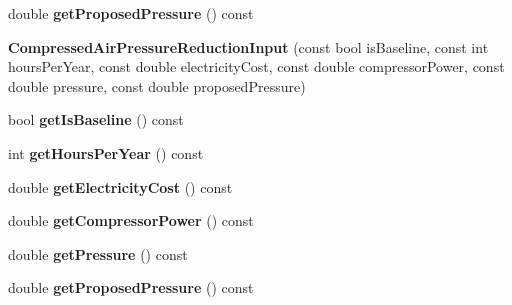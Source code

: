 \begin{DoxyCompactItemize}
\mbox{\label{class_compressed_air_pressure_reduction_input_a9634619a70b92c4f318e2711e144e510}} 
double {\bfseries get\+Proposed\+Pressure} () const
\item 
\mbox{\label{class_compressed_air_pressure_reduction_input_af3bea875794e64c677c753cf3836b53b}} 
{\bfseries Compressed\+Air\+Pressure\+Reduction\+Input} (const bool is\+Baseline, const int hours\+Per\+Year, const double electricity\+Cost, const double compressor\+Power, const double pressure, const double proposed\+Pressure)
\item 
\mbox{\label{class_compressed_air_pressure_reduction_input_a0ab9cf8226a03688bb37d1f8bd55f488}} 
bool {\bfseries get\+Is\+Baseline} () const
\item 
\mbox{\label{class_compressed_air_pressure_reduction_input_a0a87586eacee27fcecc81c0be80a3f7d}} 
int {\bfseries get\+Hours\+Per\+Year} () const
\item 
\mbox{\label{class_compressed_air_pressure_reduction_input_a340d012ba7c477679a32f967832f9f0b}} 
double {\bfseries get\+Electricity\+Cost} () const
\item 
\mbox{\label{class_compressed_air_pressure_reduction_input_aea1dd940ecefcd0f67847db4f74b1a92}} 
double {\bfseries get\+Compressor\+Power} () const
\item 
\mbox{\label{class_compressed_air_pressure_reduction_input_a9eadd70a4dd28b9269ad5e552e386583}} 
double {\bfseries get\+Pressure} () const
\item 
\mbox{\label{class_compressed_air_pressure_reduction_input_a9634619a70b92c4f318e2711e144e510}} 
double {\bfseries get\+Proposed\+Pressure} () const
\item 
\mbox{\label{class_compressed_air_pressure_reduction_input_af3bea875794e64c677c753cf3836b53b}} 

\end{DoxyCompactItemize}
